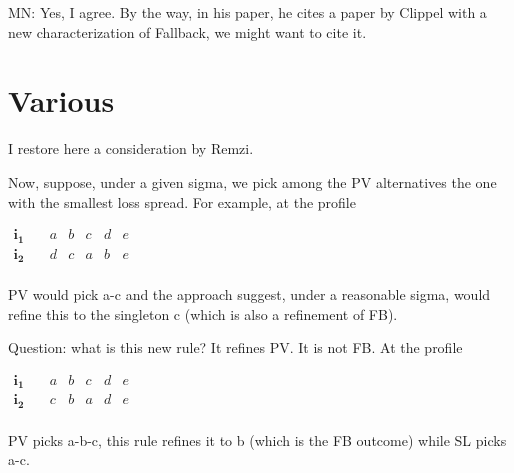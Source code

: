 \documentclass[version=3.21, pagesize, twoside=off, bibliography=totoc, DIV=calc, fontsize=12pt, a4paper]{scrartcl}
\begin{document}
\color{green}MN: Yes, I agree. By the way, in his paper, he cites a paper by Clippel with a new characterization of Fallback, we might want to cite it.\color{black}



\appendix
\section{Various}
I restore here a consideration by Remzi.

\begin{remark}[Consideration]
Now, suppose, under a given sigma, we pick among the PV alternatives the one with the smallest loss spread. For example, at the profile 
\begin{center}
	$
	\begin{array}{cccccc}
		\mathbf{i_1} \quad &a&b&c&d&e\\
		\mathbf{i_2} \quad &d&c&a&b&e\\
	\end{array}
	$
\end{center}

PV would pick a-c and the approach suggest, under a reasonable sigma, would refine this to the singleton c (which is also a refinement of FB).

Question: what is this new rule? It refines PV. It is not FB. At the profile

\begin{center}
	$
	\begin{array}{cccccc}
		\mathbf{i_1} \quad &a&b&c&d&e\\
		\mathbf{i_2} \quad &c&b&a&d&e\\
	\end{array}
	$
\end{center}

PV picks a-b-c, this rule refines it to b (which is the FB outcome) while SL picks a-c.
\end{remark}
\end{document}
